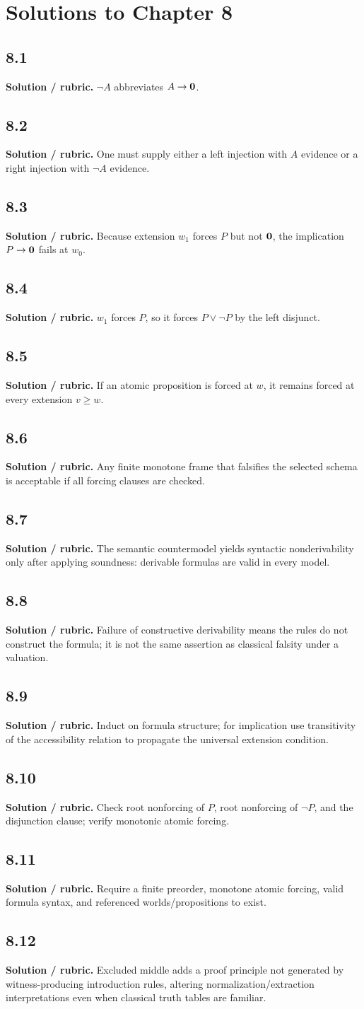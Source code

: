 \documentclass[11pt,openany]{book}
\newcommand{\sol}[2]{\section*{#1}\textbf{Solution / rubric.} #2}
\begin{document}
\chapter{Solutions to Chapter 8}
\sol{8.1}{$\neg A$ abbreviates $A\to\mathbf{0}$.}
\sol{8.2}{One must supply either a left injection with $A$ evidence or a right injection with $\neg A$ evidence.}
\sol{8.3}{Because extension $w_1$ forces $P$ but not $\mathbf{0}$, the implication $P\to\mathbf{0}$ fails at $w_0$.}
\sol{8.4}{$w_1$ forces $P$, so it forces $P\lor\neg P$ by the left disjunct.}
\sol{8.5}{If an atomic proposition is forced at $w$, it remains forced at every extension $v\ge w$.}
\sol{8.6}{Any finite monotone frame that falsifies the selected schema is acceptable if all forcing clauses are checked.}
\sol{8.7}{The semantic countermodel yields syntactic nonderivability only after applying soundness: derivable formulas are valid in every model.}
\sol{8.8}{Failure of constructive derivability means the rules do not construct the formula; it is not the same assertion as classical falsity under a valuation.}
\sol{8.9}{Induct on formula structure; for implication use transitivity of the accessibility relation to propagate the universal extension condition.}
\sol{8.10}{Check root nonforcing of $P$, root nonforcing of $\neg P$, and the disjunction clause; verify monotonic atomic forcing.}
\sol{8.11}{Require a finite preorder, monotone atomic forcing, valid formula syntax, and referenced worlds/propositions to exist.}
\sol{8.12}{Excluded middle adds a proof principle not generated by witness-producing introduction rules, altering normalization/extraction interpretations even when classical truth tables are familiar.}
\end{document}
